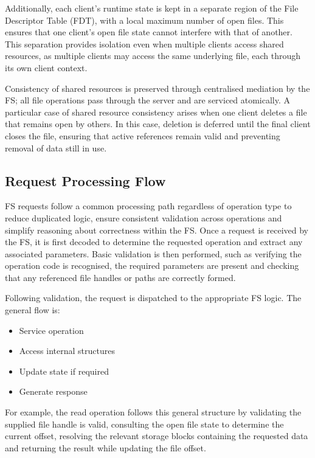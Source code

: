 Additionally, each client's runtime state is kept in a separate region of the File Descriptor Table (FDT), with a local maximum number of open files. This ensures that one client’s open file state cannot interfere with that of another. This separation provides isolation even when multiple clients access shared resources, as multiple clients may access the same underlying file, each through its own client context.

Consistency of shared resources is preserved through centralised mediation by the FS; all file operations pass through the server and are serviced atomically. A particular case of shared resource consistency arises when one client deletes a file that remains open by others. In this case, deletion is deferred until the final client closes the file, ensuring that active references remain valid and preventing removal of data still in use.

\subsection{Request Processing Flow}

FS requests follow a common processing path regardless of operation type to reduce duplicated logic, ensure consistent validation across operations and simplify reasoning about correctness within the FS. Once a request is received by the FS, it is first decoded to determine the requested operation and extract any associated parameters. Basic validation is then performed, such as verifying the operation code is recognised, the required parameters are present and checking that any referenced file handles or paths are correctly formed.

Following validation, the request is dispatched to the appropriate FS logic. The general flow is:
\begin{itemize}[itemsep=0.2ex, topsep=0.2ex]
    \item Service operation
    \item Access internal structures
    \item Update state if required
    \item Generate response
\end{itemize}

For example, the read operation follows this general structure by validating the supplied file handle is valid, consulting the open file state to determine the current offset, resolving the relevant storage blocks containing the requested data and returning the result while updating the file offset. 

